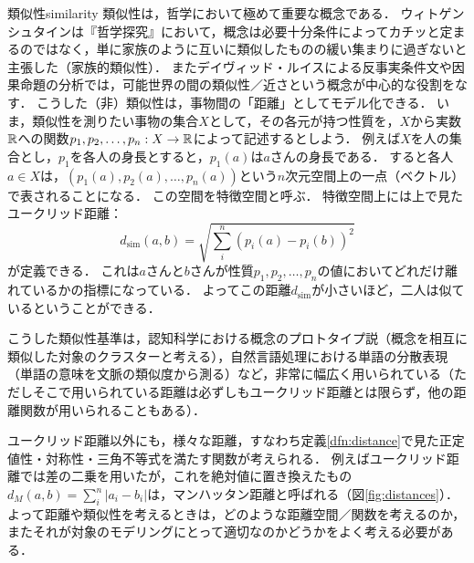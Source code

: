 \documentclass[11pt,a4paper, dvipdfmx]{jsarticle}
\begin{document}
\begin{rei}{類似性}{similarity}
類似性は，哲学において極めて重要な概念である．
ウィトゲンシュタインは『哲学探究』において，概念は必要十分条件によってカチッと定まるのではなく，単に家族のように互いに類似したものの緩い集まりに過ぎないと主張した（家族的類似性）．
またデイヴィッド・ルイスによる反事実条件文や因果命題の分析では，可能世界の間の類似性／近さという概念が中心的な役割をなす．
こうした（非）類似性は，事物間の「距離」としてモデル化できる．
いま，類似性を測りたい事物の集合$X$として，その各元が持つ性質を，$X$から実数$\mathbb{R}$への関数$p_1, p_2, \dots, p_n:X \to \mathbb{R}$によって記述するとしよう．
例えば$X$を人の集合とし，$p_1$を各人の身長とすると，$p_1(a)$は$a$さんの身長である．
すると各人$a \in X$は，$(p_1(a), p_2(a), \dots, p_n(a))$という$n$次元空間上の一点（ベクトル）で表されることになる．
この空間を特徴空間と呼ぶ．
特徴空間上には上で見たユークリッド距離：
  \[ d_{\text{sim}}(a, b) = \sqrt{\sum_i^n(p_i(a) - p_i(b))^2}\]
が定義できる．
これは$a$さんと$b$さんが性質$p_1, p_2, \dots, p_n$の値においてどれだけ離れているかの指標になっている．
よってこの距離$d_{\text{sim}}$が小さいほど，二人は似ているということができる．

こうした類似性基準は，認知科学における概念のプロトタイプ説（概念を相互に類似した対象のクラスターと考える），自然言語処理における単語の分散表現（単語の意味を文脈の類似度から測る）など，非常に幅広く用いられている（ただしそこで用いられている距離は必ずしもユークリッド距離とは限らず，他の距離関数が用いられることもある）．
\end{rei}

ユークリッド距離以外にも，様々な距離，すなわち定義\ref{dfn:distance}で見た正定値性・対称性・三角不等式を満たす関数が考えられる．
例えばユークリッド距離では差の二乗を用いたが，これを絶対値に置き換えたもの $d_M(a,b) = \sum_i^n|a_i - b_i|$は，マンハッタン距離と呼ばれる（図\ref{fig:distances}）．
よって距離や類似性を考えるときは，どのような距離空間／関数を考えるのか，またそれが対象のモデリングにとって適切なのかどうかをよく考える必要がある．
\end{document}
